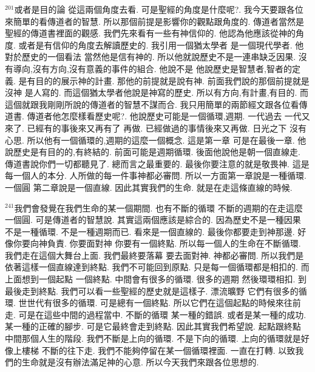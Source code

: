 \documentclass{book}
\begin{document}
$^{201}$或者是目的論 從這兩個角度去看.
可是聖經的角度是什麼呢?.
我今天要跟各位來簡單的看傳道者的智慧.
所以那個前提是影響你的觀點跟角度的.
傳道者當然是聖經的傳道書裡面的觀感.
我們先來看有一些有神信仰的.
他認為他應該從神的角度.
或者是有信仰的角度去解讀歷史的.
我引用一個猶太學者 是一個現代學者.
他對於歷史的一個看法 當然他是信有神的.
所以他就說歷史不是一連串缺乏因果.
沒有導向,沒有方向,沒有意義的事件的組合.
他說不是 他說歷史是智慧者,智者的定義.
是有目的的展示神的計畫.
那他的前提就是說有神.
前面我們說的那個前提就是沒神 是人寫的.
而這個猶太學者他說是神寫的歷史.
所以有方向,有計畫,有目的.
而這個就跟我剛剛所說的傳道者的智慧不謀而合.
我只用簡單的兩節經文跟各位看傳道書.
傳道者他怎麼樣看歷史呢?.
他說歷史可能是一個循環,週期.
一代過去 一代又來了.
已經有的事後來又再有了 再做.
已經做過的事情後來又再做.
日光之下 沒有心思.
所以他有一個循環的,週期的這麼一個概念.
這是第一章 可是在最後一章.
他說歷史是有目的的,有終結的.
前面可能是週期循環.
後面他說他是朝一個直線走.
傳道書說你們一切都聽見了.
總而言之最重要的.
最後你要注意的就是敬畏神.
這是每一個人的本分.
人所做的每一件事神都必審問.
所以一方面第一章說是一種循環.
一個圓 第二章說是一個直線.
因此其實我們的生命.
就是在走這條直線的時候.

$^{241}$我們會發覺在我們生命的某一個期間.
也有不斷的循環 不斷的週期的在走這麼一個圓.
可是傳道者的智慧說.
其實這兩個應該是綜合的.
因為歷史不是一種因果 不是一種循環.
不是一種週期而已.
看來是一個直線的.
最後你都要走到神那邊.
好像你要向神負責.
你要面對神 你要有一個終點.
所以每一個人的生命在不斷循環.
我們走在這個大舞台上面.
我們最終要落幕 要去面對神.
神都必審問.
所以我們是依著這樣一個直線達到終點.
我們不可能回到原點.
只是每一個循環都是相扣的.
而上面想到一個起點 一個終點.
中間會有很多的循環.
很多的週期 然後環環相扣.
到最後走到終點.
我們可以看一些聖經的歷史就是這樣子.
漂流曠野 它們有很多的循環.
世世代有很多的循環.
可是總有一個終點.
所以它們在這個起點的時候來往前走.
可是在這些中間的過程當中.
不斷的循環 某一種的錯誤.
或者是某一種的成功.
某一種的正確的腳步.
可是它最終會走到終點.
因此其實我們希望說.
起點跟終點 中間那個人生的階段.
我們不斷是上向的循環.
不是下向的循環.
上向的循環就是好像上樓梯 不斷的往下走.
我們不能夠停留在某一個循環裡面.
一直在打轉.
以致我們的生命就是沒有辦法滿足神的心意.
所以今天我們來跟各位思想的.
\end{document}
